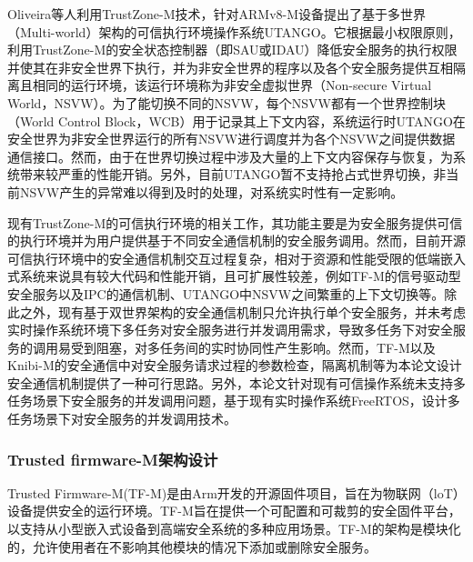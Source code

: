 \documentclass[12pt,a4paper]{ctexart}
\numberwithin{figure}{section}
\begin{document}
\par Oliveira\cite{uTango}等人利用TrustZone-M技术，针对ARMv8-M设备提出了基于多世界（Multi-world）架构的可信执行环境操作系统UTANGO。它根据最小权限原则，利用TrustZone-M的安全状态控制器（即SAU或IDAU）降低安全服务的执行权限并使其在非安全世界下执行，并为非安全世界的程序以及各个安全服务提供互相隔离且相同的运行环境，该运行环境称为非安全虚拟世界（Non-secure Virtual World，NSVW）。为了能切换不同的NSVW，每个NSVW都有一个世界控制块（World Control Block，WCB）用于记录其上下文内容，系统运行时UTANGO在安全世界为非安全世界运行的所有NSVW进行调度并为各个NSVW之间提供数据通信接口。然而，由于在世界切换过程中涉及大量的上下文内容保存与恢复，为系统带来较严重的性能开销。另外，目前UTANGO暂不支持抢占式世界切换，非当前NSVW产生的异常难以得到及时的处理，对系统实时性有一定影响。
\par 现有TrustZone-M的可信执行环境的相关工作，其功能主要是为安全服务提供可信的执行环境并为用户提供基于不同安全通信机制的安全服务调用。然而，目前开源可信执行环境中的安全通信机制交互过程复杂，相对于资源和性能受限的低端嵌入式系统来说具有较大代码和性能开销，且可扩展性较差，例如TF-M的信号驱动型安全服务以及IPC的通信机制、UTANGO中NSVW之间繁重的上下文切换等。除此之外，现有基于双世界架构的安全通信机制只允许执行单个安全服务，并未考虑实时操作系统环境下多任务对安全服务进行并发调用需求，导致多任务下对安全服务的调用易受到阻塞，对多任务间的实时协同性产生影响。然而，TF-M以及Knibi-M的安全通信中对安全服务请求过程的参数检查，隔离机制等为本论文设计安全通信机制提供了一种可行思路。另外，本论文针对现有可信操作系统未支持多任务场景下安全服务的并发调用问题，基于现有实时操作系统FreeRTOS，设计多任务场景下对安全服务的并发调用技术。

\subsubsection{ Trusted firmware-M架构设计}
\par Trusted Firmware-M(TF-M)是由Arm开发的开源固件项目，旨在为物联网（loT）设备提供安全的运行环境。TF-M旨在提供一个可配置和可裁剪的安全固件平台，以支持从小型嵌入式设备到高端安全系统的多种应用场景。TF-M的架构是模块化的，允许使用者在不影响其他模块的情况下添加或删除安全服务。
\end{document}
